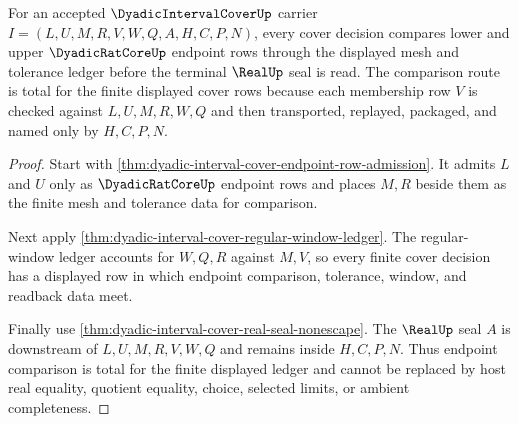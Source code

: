 \begin{theorem}
\label{thm:dyadic-interval-cover-endpoint-comparison-totality}
For an accepted $\DyadicIntervalCoverUp$ carrier $I=(L,U,M,R,V,W,Q,A,H,C,P,N)$, every cover decision compares lower and upper $\DyadicRatCoreUp$ endpoint rows through the displayed mesh and tolerance ledger before the terminal $\RealUp$ seal is read. The comparison route is total for the finite displayed cover rows because each membership row $V$ is checked against $L,U,M,R,W,Q$ and then transported, replayed, packaged, and named only by $H,C,P,N$.
\end{theorem}
\begin{proof}
Start with \autoref{thm:dyadic-interval-cover-endpoint-row-admission}. It admits $L$ and $U$ only as $\DyadicRatCoreUp$ endpoint rows and places $M,R$ beside them as the finite mesh and tolerance data for comparison.

Next apply \autoref{thm:dyadic-interval-cover-regular-window-ledger}. The regular-window ledger accounts for $W,Q,R$ against $M,V$, so every finite cover decision has a displayed row in which endpoint comparison, tolerance, window, and readback data meet.

Finally use \autoref{thm:dyadic-interval-cover-real-seal-nonescape}. The $\RealUp$ seal $A$ is downstream of $L,U,M,R,V,W,Q$ and remains inside $H,C,P,N$. Thus endpoint comparison is total for the finite displayed ledger and cannot be replaced by host real equality, quotient equality, choice, selected limits, or ambient completeness.
\end{proof}

